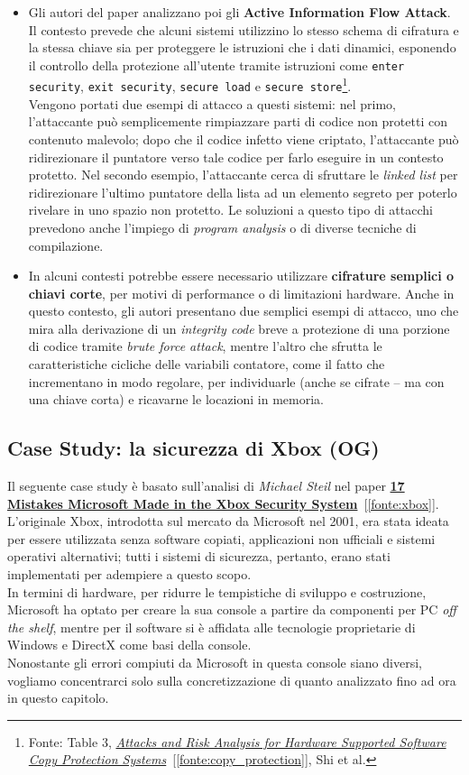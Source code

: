 \begin{itemize}
    \item Gli autori del paper analizzano poi gli \textbf{Active Information Flow Attack}. Il contesto prevede che alcuni sistemi utilizzino lo stesso schema di cifratura e la stessa chiave sia per proteggere le istruzioni che i dati dinamici, esponendo il controllo della protezione all'utente tramite istruzioni come \texttt{enter security}, 
    \texttt{exit security}, \texttt{secure load} e \texttt{secure store}\footnote{Fonte: Table 3, \hyperref[fonte:copy_protection]{\textit{Attacks and Risk Analysis for Hardware Supported Software Copy Protection Systems}}~[\ref{fonte:copy_protection}], Shi et al.}.\\ Vengono portati due esempi di attacco a questi sistemi: nel primo, l'attaccante può semplicemente rimpiazzare parti di codice non protetti con contenuto malevolo;
    dopo che il codice infetto viene criptato, l'attaccante può ridirezionare il puntatore verso tale codice per farlo eseguire in un contesto protetto. Nel secondo esempio, l'attaccante cerca di sfruttare le \textit{linked list} per ridirezionare l'ultimo puntatore della lista ad un elemento segreto per poterlo rivelare in uno spazio non protetto. Le soluzioni
    a questo tipo di attacchi prevedono anche l'impiego di \textit{program analysis} o di diverse tecniche di compilazione.
    \item In alcuni contesti potrebbe essere necessario utilizzare \textbf{cifrature semplici o chiavi corte}, per motivi di performance o di limitazioni hardware. Anche in questo contesto, gli autori presentano due semplici esempi di attacco, uno che mira alla derivazione di un \textit{integrity code} breve a protezione di una porzione di codice tramite \textit{brute force attack}, 
    mentre l'altro che sfrutta le caratteristiche cicliche delle variabili contatore, come il fatto che incrementano in modo regolare, per individuarle (anche se cifrate -- ma con una chiave corta) e ricavarne le locazioni in memoria.
\end{itemize}

\subsection{Case Study: la sicurezza di Xbox (OG)}
Il seguente case study è basato sull'analisi di \textit{Michael Steil} nel paper \hyperref[fonte:xbox]{\textbf{17 Mistakes Microsoft Made in the Xbox Security System}}~[\ref{fonte:xbox}].\\
L'originale Xbox, introdotta sul mercato da Microsoft nel 2001, era stata ideata per essere utilizzata senza software copiati, applicazioni non ufficiali e sistemi operativi alternativi; tutti i sistemi di sicurezza, pertanto, erano stati implementati per adempiere a questo scopo.\\
In termini di hardware, per ridurre le tempistiche di sviluppo e costruzione, Microsoft ha optato per creare la sua console a partire da componenti per PC \textit{off the shelf}, mentre per il software si è affidata alle tecnologie proprietarie di Windows e DirectX come basi della console.\\
Nonostante gli errori compiuti da Microsoft in questa console siano diversi, vogliamo concentrarci solo sulla concretizzazione di quanto analizzato fino ad ora in questo capitolo.
